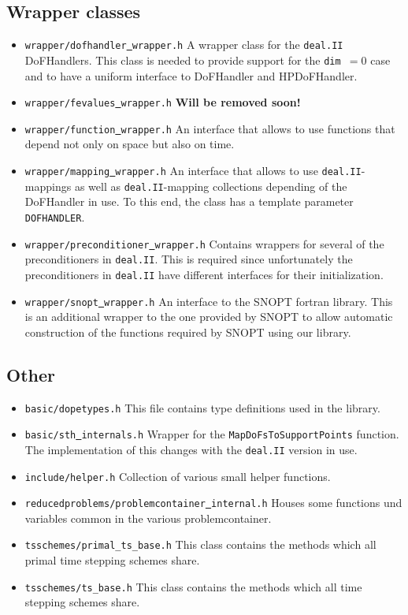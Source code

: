 \subsection{Wrapper classes}
\begin{itemize}
  \item \texttt{wrapper/dofhandler\underline{ }wrapper.h} A wrapper class for the \texttt{deal.II} DoFHandlers. This 
    class is needed to provide support for the \texttt{dim $= 0$} case and to have a uniform interface to 
    DoFHandler and HPDoFHandler.
  \item \texttt{wrapper/fevalues\underline{ }wrapper.h} {\bf Will be removed soon!}
  \item \texttt{wrapper/function\underline{ }wrapper.h} An interface that allows to use functions that depend 
    not only on space but also on time.
  \item \texttt{wrapper/mapping\underline{ }wrapper.h} An interface that allows to use \texttt{deal.II}-mappings as well as  \texttt{deal.II}-mapping collections depending of the DoFHandler in use. To this end, the class has a template parameter \texttt{DOFHANDLER}.
  \item \texttt{wrapper/preconditioner\underline{ }wrapper.h} Contains wrappers for several of the preconditioners
    in \texttt{deal.II}. This is required since unfortunately the preconditioners in \texttt{deal.II} have different
    interfaces for their initialization.
  \item \texttt{wrapper/snopt\underline{ }wrapper.h} An interface to the SNOPT fortran library. This is an additional
    wrapper to the one provided by SNOPT to allow automatic construction of the functions required 
    by SNOPT using our library.
\end{itemize}

\subsection{Other}
\begin{itemize}
  \item \texttt{basic/dopetypes.h} This file contains type definitions used in the library. 
\item \texttt{basic/sth\underline{ }internals.h} Wrapper for the \texttt{MapDoFsToSupportPoints} function. The implementation of this changes with the \texttt{deal.II} version in use.
\item \texttt{include/helper.h} Collection of various small helper functions.
\item \texttt{reducedproblems/problemcontainer\underline{ }internal.h} Houses some functions und variables common in the various problemcontainer.
\item \texttt{tsschemes/primal\_ts\_base.h}  This class contains the methods which all primal time stepping schemes share.
\item \texttt{tsschemes/ts\_base.h}  This class contains the methods which all time stepping schemes share.
\end{itemize}
